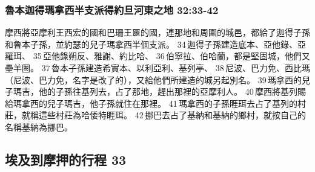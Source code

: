 \subsubsection{魯本迦得瑪拿西半支派得約旦河東之地 32:33-42}
摩西將亞摩利王西宏的國和巴珊王噩的國，連那地和周圍的城邑，都給了迦得子孫和魯本子孫，並約瑟的兒子瑪拿西半個支派。 34 迦得子孫建造底本、亞他錄、亞羅珥、 35 亞他錄朔反、雅謝、約比哈、 36 伯寧拉、伯哈蘭，都是堅固城，他們又壘羊圈。 37 魯本子孫建造希實本、以利亞利、基列亭、 38 尼波、巴力免、西比瑪（尼波、巴力免，名字是改了的），又給他們所建造的城另起別名。 39 瑪拿西的兒子瑪吉，他的子孫往基列去，占了那地，趕出那裡的亞摩利人。 40 摩西將基列賜給瑪拿西的兒子瑪吉，他子孫就住在那裡。 41 瑪拿西的子孫睚珥去占了基列的村莊，就稱這些村莊為哈倭特睚珥。 42 挪巴去占了基納和基納的鄉村，就按自己的名稱基納為挪巴。


\subsection{埃及到摩押的行程 33}
